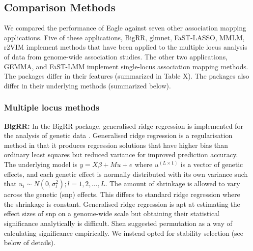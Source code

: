 \documentclass{nature}
\begin{document}
\subsection{Comparison Methods}

We compared the performance of Eagle against seven other association mapping applications. 
Five of these applications, BigRR, glmnet, FaST-LASSO, MMLM, r2VIM implement methods that have been applied to the multiple locus analysis of data from genome-wide association studies. 
The other two applications, GEMMA, and FaST-LMM implement single-locus association mapping methods. 
The packages 
differ in their features (summarized in Table X).  The packages also differ in their underlying methods (summarized below). 

\subsubsection{Multiple locus methods}

\textbf{BigRR:}  In the BigRR package,  generalised ridge regression is implemented  for
the analysis of genetic data \cite{shen2013novel}.  Generalised ridge regression 
 is a regularisation method in that it produces regression solutions 
that have higher bias than ordinary least squares but reduced variance for improved prediction accuracy. The underlying 
model is  $y = X \beta + M u + e$ where $u^{(L \times 1)}$ is a vector of genetic effects, and each genetic 
effect is normally distributed with its own variance such that $u_l \sim N(0, \sigma^2_l); l=1,2, \ldots, L$.  The 
amount of shrinkage is allowed to vary across the genetic (snp) effects. This differs to 
standard ridge regression where the shrinkage is constant. 
Generalised ridge regression is apt at estimating the effect sizes of snp on a genome-wide scale but  obtaining their 
statistical significance analytically is difficult. Shen \cite{shen2013novel} suggested permutation as a way of calculating significance 
empirically. We instead opted for stability selection (see below of details). 
\end{document}
